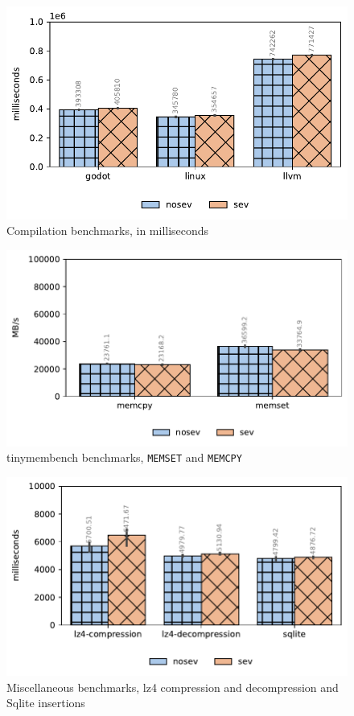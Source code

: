 \documentclass[twocolumn]{article}
\begin{document}
    \begin{figure}
        \centering
        \includegraphics[width=\columnwidth]{img/compilation-benchmark.pdf}
        \caption{Compilation benchmarks, in milliseconds}
    \end{figure}

    \begin{figure}
        \centering
        \includegraphics[width=\columnwidth]{img/tinymembenchmark.pdf}
        \caption{tinymembench benchmarks, \texttt{MEMSET} and \texttt{MEMCPY}}
    \end{figure}

    \begin{figure}
        \centering
        \includegraphics[width=\columnwidth]{img/misc.pdf}
        \caption{Miscellaneous benchmarks, lz4 compression and decompression and Sqlite insertions}
    \end{figure}
\end{document}

